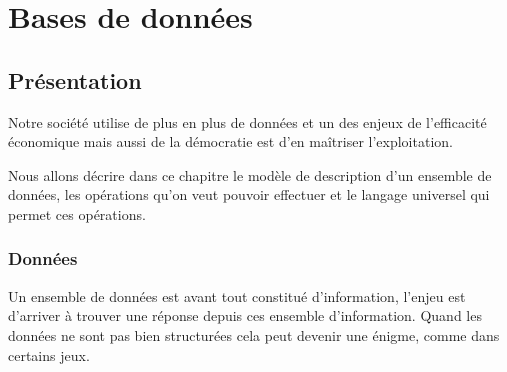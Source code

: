 \chapter{Bases de données}
\thispagestyle{empty}
\section{Présentation}
Notre société utilise de plus en plus de données et un des enjeux de l'efficacité économique mais aussi de la démocratie est d'en maîtriser l'exploitation.

Nous allons décrire dans ce chapitre le modèle de description d'un ensemble de données, les opérations qu'on veut pouvoir effectuer et le langage universel qui permet ces opérations.
\subsection{Données}
Un ensemble de données est avant tout constitué d'information, l'enjeu est d'arriver à trouver une réponse depuis ces ensemble d'information. Quand les données ne sont pas bien structurées cela peut devenir une énigme, comme dans certains jeux.

